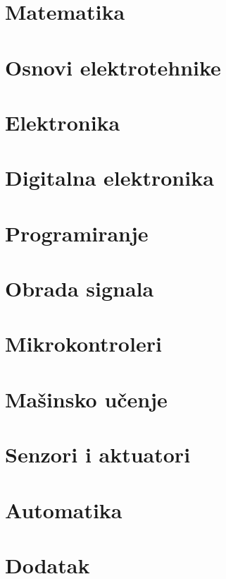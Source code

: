 \documentclass{book}
\begin{document}
	\tableofcontents
	
	\chapter{Matematika}
			
	
	\chapter{Osnovi elektrotehnike}
		
	
	\chapter{Elektronika}
		
	
	\chapter{Digitalna elektronika}
		
	
	\chapter{Programiranje}
		
	
	\chapter{Obrada signala}
		
	
	\chapter{Mikrokontroleri}
		
	
	\chapter{Ma\v sinsko u\v cenje}
		
	
	\chapter{Senzori i aktuatori}
		
	
	\chapter{Automatika}
		
	
	\chapter{Dodatak}
		
	
\end{document}
